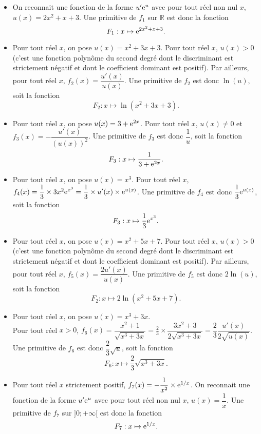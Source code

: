 \documentclass[11pt,fleqn, openany]{book} %
\begin{document}
\begin{solution}\hspace{0pt}

\begin{itemize}\item On reconnait une fonction de la forme \(u'\mathrm{e}^u\) avec pour tout réel non nul \(x\), \(u(x)=2x^2+x+3\). Une primitive de \(f_1\) sur \(\mathbb{R}\) est donc la fonction \[F_1:x\mapsto \mathrm{e}^{2x^2+x+3}.\]
	\item Pour tout réel \(x\), on pose \(u(x)=x^2+3x+3\). Pour tout réel \(x\), \(u(x)>0\) (c'est une fonction polynôme du second degré dont le discriminant est strictement négatif et dont le coefficient dominant est positif). Par ailleurs, pour tout réel \(x\), \(f_2(x)=\dfrac{u'(x)}{u(x)}\). Une primitive de \(f_2\) est donc \(\ln(u)\), soit la fonction \[F_2:x\mapsto \ln(x^2+3x+3).\]

	\item Pour tout réel \(x\), on pose \(u(x)=3+\mathrm{e}^{2x}\). Pour tout réel \(x\), \(u(x) \neq 0\) et \(f_3(x)=-\dfrac{u'(x)}{(u(x))^2}\). Une primitive de \(f_3\) est donc \(\dfrac{1}{u}\), soit la fonction \[F_3:x\mapsto \dfrac{1}{3+\mathrm{e}^{2x}}.\]

	\item Pour tout réel \(x\), on pose \(u(x)=x^3\). Pour tout réel \(x\), \(f_4(x)=\dfrac{1}{3} \times 3x^2\mathrm{e}^{x^3}=\dfrac{1}{3}\times u'(x) \times \mathrm{e}^{u(x)}\). Une primitive de \(f_4\) est donc \(\dfrac{1}{3}\mathrm{e}^{u(x)}\), soit la fonction \[F_3:x\mapsto \dfrac{1}{3}\mathrm{e}^{x^3}.\]

	\item Pour tout réel \(x\), on pose \(u(x)=x^2+5x+7\). Pour tout réel \(x\), \(u(x)>0\) (c'est une fonction polynôme du second degré dont le discriminant est strictement négatif et dont le coefficient dominant est positif). Par ailleurs, pour tout réel \(x\), \(f_5(x)=\dfrac{2u'(x)}{u(x)}\). Une primitive de \(f_5\) est donc \(2\ln(u)\), soit la fonction \[F_2:x\mapsto 2\ln(x^2+5x+7).\]

	\item Pour tout réel \(x\), on pose \(u(x)=x^3+3x\). \\ Pour tout réel \(x>0\), \(f_6(x)=\dfrac{x^2+1}{\sqrt{x^3+3x}} = \frac{2}{3} \times\dfrac{3x^2+3}{2\sqrt{x^3+3x}}=\dfrac{2}{3}\dfrac{u'(x)}{2\sqrt{u(x)}}\). Une primitive de \(f_6\) est donc \(\dfrac{2}{3}\sqrt{u}\), soit la fonction \[F_6:x\mapsto \dfrac{2}{3}\sqrt{x^3+3x}.\]
	

\item Pour tout réel \(x\) strictement positif, \(f_7(x)=-\dfrac{1}{x^2}\times \mathrm{e}^{1/x}\). On reconnait une fonction de la forme \(u'\mathrm{e}^u\) avec pour tout réel non nul \(x\), \(u(x)=\dfrac{1}{x}\). Une primitive de \(f_7\) sur \(]0;+\infty[\) est donc la fonction \[F_7:x\mapsto \mathrm{e}^{1/x}.\]


\end{itemize}
\end{solution}
\end{document}
